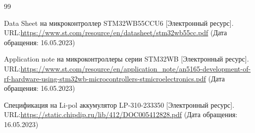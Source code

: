 \newpage
\renewcommand\refname{\centering СПИСОК ИСПОЛЬЗОВАННЫХ ИСТОЧНИКОВ}
\begin {thebibliography} {99}


Data Sheet на микроконтроллер STM32WB55CCU6  [Электронный ресурс]. URL:\href{https://www.st.com/resource/en/datasheet/stm32wb55cc.pdf}{https://www.st.com/resource/en/datasheet/stm32wb55cc.pdf} (Дата обращения: 16.05.2023)


Application note на микроконтроллеры серии STM32WB  [Электронный ресурс]. URL:\href{https://www.st.com/resource/en/application_note/an5165-development-of-rf-hardware-using-stm32wb-microcontrollers-stmicroelectronics.pdf}{https://www.st.com/resource/en/application\_note/an5165-development-of-rf-hardware-using-stm32wb-microcontrollers-stmicroelectronics.pdf} (Дата обращения: 16.05.2023)


Спецификация на Li-pol аккумулятор LP-310-233350  [Электронный ресурс]. URL:\href{https://static.chipdip.ru/lib/412/DOC005412828.pdf}{https://static.chipdip.ru/lib/412/DOC005412828.pdf} (Дата обращения: 16.05.2023)











\end {thebibliography}



